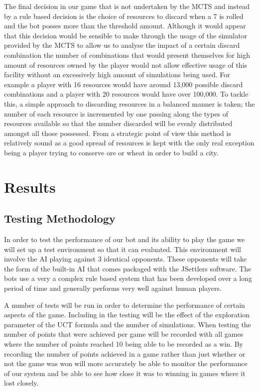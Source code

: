 \documentclass[]{article}
\let\oldsection\section
\renewcommand\section{\clearpage\oldsection}
\begin{document}
\par The final decision in our game that is not undertaken by the MCTS and instead by a rule based decision is the choice of resources to discard when a 7 is rolled and the bot posses more than the threshold amount. Although it would appear that this decision would be sensible to make through the usage of the simulator provided by the MCTS to allow us to analyse the impact of a certain discard combination the number of combinations that would present themselves for high amount of resources owned by the player would not allow effective usage of this facility without an excessively high amount of simulations being used. For example a player with 16 resources would have around 13,000 possible discard combinations and a player with 20 resources would have over 100,000. To tackle this, a simple approach to discarding resources in a balanced manner is taken; the number of each resource is incremented by one passing along the types of resources available so that the number discarded will be evenly distributed amongst all those possessed. From a strategic point of view this method is relatively sound as a good spread of resources is kept with the only real exception being a player trying to conserve ore or wheat in order to build a city.

\section{Results}

\subsection{Testing Methodology}
In order to test the performance of our bot and its ability to play the game we will set up a test environment so that it can evaluated. This environment will involve the AI playing against 3 identical opponents. These opponents will take the form of the built-in AI that comes packaged with the JSettlers software. The bots use a very a complex rule based system that has been developed over a long period of time and generally performs very well against human players. 

\par A number of tests will be run in order to determine the performance of certain aspects of the game. Including in the testing will be the effect of the exploration parameter of the UCT formula and the number of simulations. When testing the number of points that were achieved per game will be recorded with all games where the number of points reached 10 being able to be recorded as a win. By recording the number of points achieved in a game rather than just whether or not the game was won will more accurately be able to monitor the performance of our system and be able to see how close it was to winning in games where it lost closely. 
\end{document}
